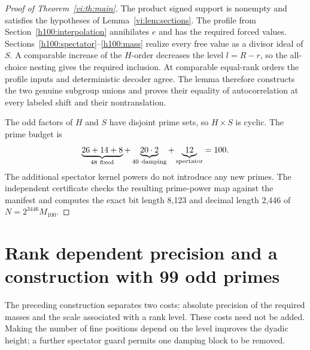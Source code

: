 \documentclass[11pt]{article}
\numberwithin{equation}{section}
\theoremstyle{definition}
\theoremstyle{remark}
\begin{document}
\begin{proof}[Proof of Theorem~\ref{vi:th:main}]
The product signed support is nonempty and satisfies the hypotheses of Lemma~\ref{vi:lem:sections}. The profile from Section~\ref{h100:interpolation} annihilates $e$ and has the required forced values. Sections~\ref{h100:spectator}--\ref{h100:mass} realize every free value as a divisor ideal of $S$. A comparable increase of the $H$-order decreases the level $l=R-r$, so the all-choice nesting gives the required inclusion. At comparable equal-rank orders the profile inputs and deterministic decoder agree. The lemma therefore constructs the two genuine subgroup unions and proves their equality of autocorrelation at every labeled shift and their nontranslation.

The odd factors of $H$ and $S$ have disjoint prime sets, so $H\times S$ is cyclic. The prime budget is
\[
 \underbrace{26+14+8}_{48\ {\rm fixed}}
 +\underbrace{20\cdot2}_{40\ {\rm damping}}
 +\underbrace{12}_{\rm spectator}=100.
\]
The additional spectator kernel powers do not introduce any new primes. The independent certificate checks the resulting prime-power map against the manifest and computes the exact bit length 8,123 and decimal length 2,446 of $N=2^{3446}M_{100}$.
\end{proof}




\section{Rank dependent precision and a construction with 99 odd primes}
\label{v2:sec:refined-constructions}
The preceding construction separates two costs: absolute precision of the required masses and the scale associated with a rank level. These costs need not be added. Making the number of fine positions depend on the level improves the dyadic height; a further spectator guard permits one damping block to be removed.
\end{document}
